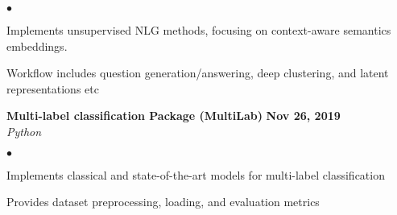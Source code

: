 \documentclass[margin,line]{res}
\newenvironment{list2}{
  \begin{list}{$\bullet$}{%
      \setlength{\itemsep}{0in}
      \setlength{\parsep}{0in} \setlength{\parskip}{0in}
      \setlength{\topsep}{0in} \setlength{\partopsep}{0in} 
      \setlength{\leftmargin}{0.2in}}}{\end{list}}
\begin{document}
\begin{resume}
\begin{list2}
\item Implements unsupervised NLG methods, focusing on context-aware semantics embeddings.
\item Workflow includes question generation/answering, deep clustering, and latent representations etc
\end{list2}

{\textbf{Multi-label classification Package (MultiLab)} \hfill {\bf {Nov 26, 2019}}}\\
{\em Python} \hfill {\href{https://github.com/monk1337/MultiLab}{\color{blue}{\textbf{[Github]}}}}\\

\begin{list2}

\item Implements classical and state-of-the-art models for multi-label classification
\item Provides dataset preprocessing, loading, and evaluation metrics
\end{list2}

\end{resume}
\end{document}
